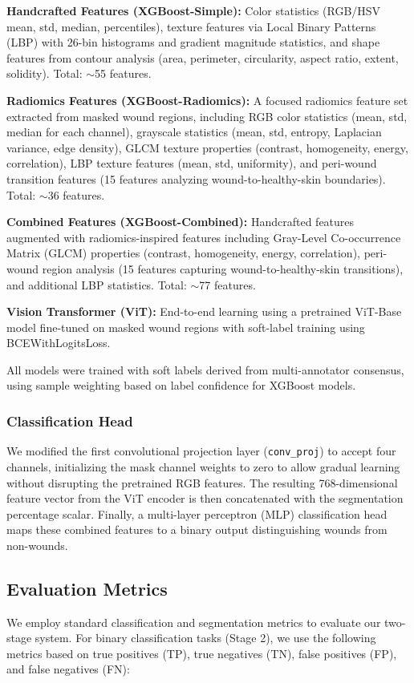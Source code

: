\documentclass{article}
\begin{document}
\textbf{Handcrafted Features (XGBoost-Simple):} Color statistics (RGB/HSV mean, std, median, percentiles), texture features via Local Binary Patterns (LBP) with 26-bin histograms and gradient magnitude statistics, and shape features from contour analysis (area, perimeter, circularity, aspect ratio, extent, solidity). Total: $\sim$55 features.

\textbf{Radiomics Features (XGBoost-Radiomics):} A focused radiomics feature set extracted from masked wound regions, including RGB color statistics (mean, std, median for each channel), grayscale statistics (mean, std, entropy, Laplacian variance, edge density), GLCM texture properties (contrast, homogeneity, energy, correlation), LBP texture features (mean, std, uniformity), and peri-wound transition features (15 features analyzing wound-to-healthy-skin boundaries). Total: $\sim$36 features.

\textbf{Combined Features (XGBoost-Combined):} Handcrafted features augmented with radiomics-inspired features including Gray-Level Co-occurrence Matrix (GLCM) properties (contrast, homogeneity, energy, correlation), peri-wound region analysis (15 features capturing wound-to-healthy-skin transitions), and additional LBP statistics. Total: $\sim$77 features.

\textbf{Vision Transformer (ViT):} End-to-end learning using a pretrained ViT-Base model fine-tuned on masked wound regions with soft-label training using BCEWithLogitsLoss.

All models were trained with soft labels derived from multi-annotator consensus, using sample weighting based on label confidence for XGBoost models.

    \subsubsection{Classification Head}
    We modified the first convolutional projection layer (\texttt{conv\_proj}) to accept four channels, initializing the mask channel weights to zero to allow gradual learning without disrupting the pretrained RGB features. The resulting 768-dimensional feature vector from the ViT encoder is then concatenated with the segmentation percentage scalar. Finally, a multi-layer perceptron (MLP) classification head maps these combined features to a binary output distinguishing wounds from non-wounds.


\subsection{Evaluation Metrics}
We employ standard classification and segmentation metrics to evaluate our two-stage system. For binary classification tasks (Stage 2), we use the following metrics based on true positives (TP), true negatives (TN), false positives (FP), and false negatives (FN):
\end{document}
